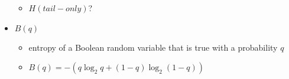 \documentclass[compress, 9pt]{beamer}
\begin{document}
\begin{frame}
\begin{itemize}
\begin{itemize}
\item <6-> $H(tail-only)$?
\label{sec-1-1-2-5}%
\end{itemize} %

\item <7-> $B(q)$
\label{sec-1-1-3}%
\begin{itemize}

\item <8-> entropy of a Boolean random variable that is true with a probability $q$
\label{sec-1-1-3-1}%

\item <8-> $B(q) = -(q \log_2 q + (1-q) \log_2 (1-q))$
\label{sec-1-1-3-2}%
\end{itemize} %
\end{itemize} %
\end{frame}
\end{document}
